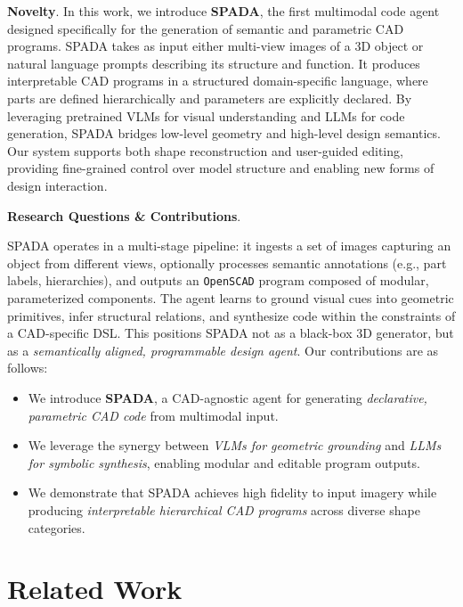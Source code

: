 \documentclass[letterpaper]{article} %
\begin{document}
\textbf{Novelty}. In this work, we introduce \textbf{SPADA}, the first multimodal code agent designed specifically for the generation of semantic and parametric CAD programs. SPADA takes as input either multi-view images of a 3D object or natural language prompts describing its structure and function. It produces interpretable CAD programs in a structured domain-specific language, where parts are defined hierarchically and parameters are explicitly declared. By leveraging pretrained VLMs for visual understanding and LLMs for code generation, SPADA bridges low-level geometry and high-level design semantics. Our system supports both shape reconstruction and user-guided editing, providing fine-grained control over model structure and enabling new forms of design interaction.

\textbf{Research Questions \& Contributions}.

SPADA operates in a multi-stage pipeline: it ingests a set of images capturing an object from different views, optionally processes semantic annotations (e.g., part labels, hierarchies), and outputs an \texttt{OpenSCAD} program composed of modular, parameterized components. The agent learns to ground visual cues into geometric primitives, infer structural relations, and synthesize code within the constraints of a CAD-specific DSL. This positions SPADA not as a black-box 3D generator, but as a \emph{semantically aligned, programmable design agent}. Our contributions are as follows:

\begin{itemize}
    \item We introduce \textbf{SPADA}, a CAD-agnostic agent for generating \emph{declarative, parametric CAD code} from multimodal input.
    \item We leverage the synergy between \emph{VLMs for geometric grounding} and \emph{LLMs for symbolic synthesis}, enabling modular and editable program outputs.
    \item We demonstrate that SPADA achieves high fidelity to input imagery while producing \emph{interpretable hierarchical CAD programs} across diverse shape categories.
\end{itemize}


\section{Related Work}
\end{document}
